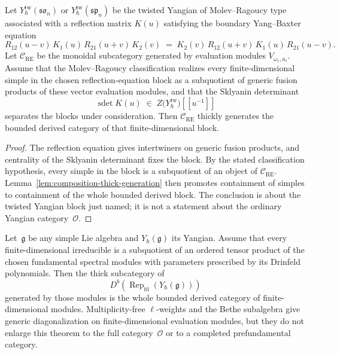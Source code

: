 \begin{proposition}
\label{prop:mc3-reflection-equation-five-family}
Let $Y^{\mathrm{tw}}_\hbar(\mathfrak{so}_n)$ or $Y^{\mathrm{tw}}_\hbar(\mathfrak{sp}_n)$
be the twisted Yangian of Molev--Ragoucy type~\cite{MolevRagoucy02,
Molev07} associated with a reflection matrix $K(u)$ satisfying the
boundary Yang--Baxter equation
\[
 R_{12}(u-v)\,K_1(u)\,R_{21}(u+v)\,K_2(v) \;=\;
 K_2(v)\,R_{12}(u+v)\,K_1(u)\,R_{21}(u-v).
\]
Let $\mathcal{C}_{\mathrm{RE}}$ be the monoidal subcategory generated
by evaluation modules $V_{\omega_1, a_i}$. Assume that the
Molev--Ragoucy classification realizes every finite-dimensional
simple in the chosen reflection-equation block as a subquotient of
generic fusion products of these vector evaluation modules, and that
the Sklyanin determinant
\[
 \operatorname{sdet} K(u) \;\in\; Z\!\big(Y^{\mathrm{tw}}_\hbar\big)[[u^{-1}]]
\]
separates the blocks under consideration. Then
\(\mathcal{C}_{\mathrm{RE}}\) thickly generates the bounded derived
category of that finite-dimensional block.
\end{proposition}

\begin{proof}
The reflection equation gives intertwiners on generic fusion
products, and centrality of the Sklyanin determinant
\cite{Sklyanin88, Molev07} fixes the block. By the stated
classification hypothesis, every simple in the block is a subquotient
of an object of \(\mathcal{C}_{\mathrm{RE}}\). Lemma~\ref{lem:composition-thick-generation}
then promotes containment of simples to containment of the whole
bounded derived block. The conclusion is about the twisted Yangian
block just named; it is not a statement about the ordinary Yangian
category~\(\mathcal O\).
\end{proof}

\begin{theorem}
\label{thm:mc3-universal-multiplicity-free-five-family}
Let~$\mathfrak{g}$ be any simple Lie algebra and $Y_\hbar(\mathfrak{g})$
its Yangian. Assume that every finite-dimensional irreducible is a
subquotient of an ordered tensor product of the chosen fundamental
spectral modules with parameters prescribed by its Drinfeld
polynomials. Then the thick subcategory of
\[
D^b(\operatorname{Rep}_{\mathrm{fd}}(Y_\hbar(\mathfrak{g})))
\]
generated by those modules is the whole bounded
derived category of finite-dimensional modules.
Multiplicity-free $\ell$-weights and the Bethe subalgebra give
generic diagonalization on finite-dimensional evaluation modules, but they do
not enlarge this theorem to the full category~\(\mathcal O\) or to a
completed prefundamental category.
\end{theorem}


